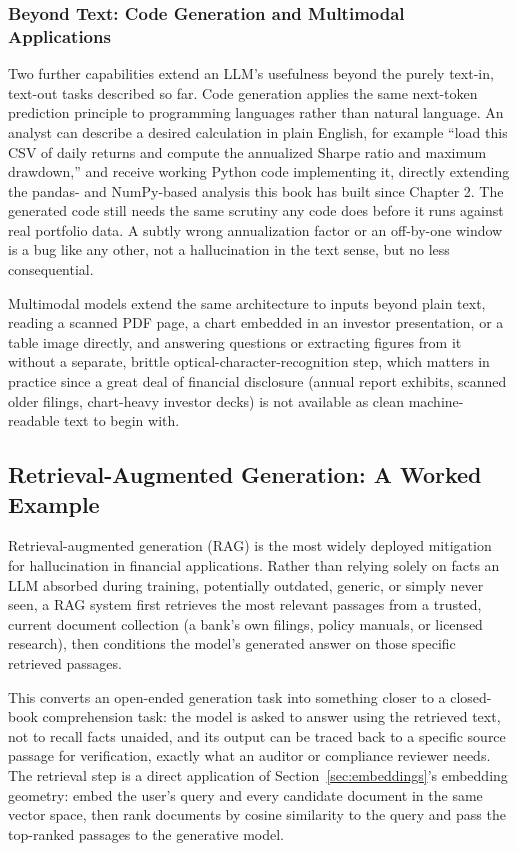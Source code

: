 \documentclass[../ai_in_finance]{subfiles}
\begin{document}
\subsubsection*{Beyond Text: Code Generation and Multimodal Applications}

Two further capabilities extend an LLM's usefulness beyond the purely text-in, text-out tasks described so far. Code generation applies the same next-token prediction principle to programming languages rather than natural language. An analyst can describe a desired calculation in plain English, for example ``load this CSV of daily returns and compute the annualized Sharpe ratio and maximum drawdown,'' and receive working Python code implementing it, directly extending the pandas- and NumPy-based analysis this book has built since Chapter 2. The generated code still needs the same scrutiny any code does before it runs against real portfolio data. A subtly wrong annualization factor or an off-by-one window is a bug like any other, not a hallucination in the text sense, but no less consequential.

Multimodal models extend the same architecture to inputs beyond plain text, reading a scanned PDF page, a chart embedded in an investor presentation, or a table image directly, and answering questions or extracting figures from it without a separate, brittle optical-character-recognition step, which matters in practice since a great deal of financial disclosure (annual report exhibits, scanned older filings, chart-heavy investor decks) is not available as clean machine-readable text to begin with.

\subsection{Retrieval-Augmented Generation: A Worked Example}
\label{sec:rag}

Retrieval-augmented generation (RAG) is the most widely deployed mitigation for hallucination in financial applications. Rather than relying solely on facts an LLM absorbed during training, potentially outdated, generic, or simply never seen, a RAG system first retrieves the most relevant passages from a trusted, current document collection (a bank's own filings, policy manuals, or licensed research), then conditions the model's generated answer on those specific retrieved passages.

This converts an open-ended generation task into something closer to a closed-book comprehension task: the model is asked to answer using the retrieved text, not to recall facts unaided, and its output can be traced back to a specific source passage for verification, exactly what an auditor or compliance reviewer needs. The retrieval step is a direct application of Section~\ref{sec:embeddings}'s embedding geometry: embed the user's query and every candidate document in the same vector space, then rank documents by cosine similarity to the query and pass the top-ranked passages to the generative model.
\end{document}
